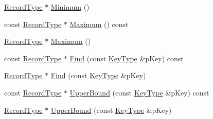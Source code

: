 \begin{DoxyCompactItemize}
\item 
\hyperlink{class_fbx_red_black_tree_1_1_record_type}{Record\+Type} $\ast$ \hyperlink{class_fbx_red_black_tree_abc02bb7015d4966b5bba54f5e29120da}{Minimum} ()
\item 
const \hyperlink{class_fbx_red_black_tree_1_1_record_type}{Record\+Type} $\ast$ \hyperlink{class_fbx_red_black_tree_ab4cbb7bbe5fab913a8296708a5b222ed}{Maximum} () const
\item 
\hyperlink{class_fbx_red_black_tree_1_1_record_type}{Record\+Type} $\ast$ \hyperlink{class_fbx_red_black_tree_a03b6f025d8466c40949f87a65c24e92e}{Maximum} ()
\item 
const \hyperlink{class_fbx_red_black_tree_1_1_record_type}{Record\+Type} $\ast$ \hyperlink{class_fbx_red_black_tree_a08a08c8b1a259c5d5bba01558198e4cb}{Find} (const \hyperlink{class_fbx_red_black_tree_a241b31c6972995417d193458b7bb27e2}{Key\+Type} \&p\+Key) const
\item 
\hyperlink{class_fbx_red_black_tree_1_1_record_type}{Record\+Type} $\ast$ \hyperlink{class_fbx_red_black_tree_a10d0f431d89e767bee24812cc4be9f3f}{Find} (const \hyperlink{class_fbx_red_black_tree_a241b31c6972995417d193458b7bb27e2}{Key\+Type} \&p\+Key)
\item 
const \hyperlink{class_fbx_red_black_tree_1_1_record_type}{Record\+Type} $\ast$ \hyperlink{class_fbx_red_black_tree_a42a816012df609184b4cef2889ac868a}{Upper\+Bound} (const \hyperlink{class_fbx_red_black_tree_a241b31c6972995417d193458b7bb27e2}{Key\+Type} \&p\+Key) const
\item 
\hyperlink{class_fbx_red_black_tree_1_1_record_type}{Record\+Type} $\ast$ \hyperlink{class_fbx_red_black_tree_a90138895586387a60eb91306888a2ab6}{Upper\+Bound} (const \hyperlink{class_fbx_red_black_tree_a241b31c6972995417d193458b7bb27e2}{Key\+Type} \&p\+Key)
\end{DoxyCompactItemize}
